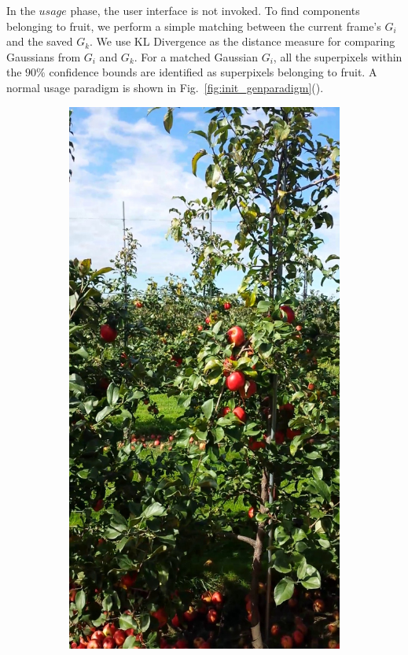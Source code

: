 In the $\textit{usage}$ phase, the user interface is not invoked. To find components belonging to fruit, we perform a simple matching between the current frame's $G_i$ and the saved $G_k$. We use KL Divergence as the distance measure for comparing Gaussians from $G_i$ and $G_k$. For a matched Gaussian $G_i$, all the superpixels within the $90\%$ confidence bounds are identified as superpixels belonging to fruit. A normal usage paradigm is shown in Fig.~\ref{fig:init_genparadigm}().


\begin{figure}[!hbpt]
        \centering
        \begin{subfigure}[b]{.23 \textwidth}
            \includegraphics[width=\textwidth]{figures/detection/pipeline1.jpg}           

\end{subfigure}
\end{figure}
